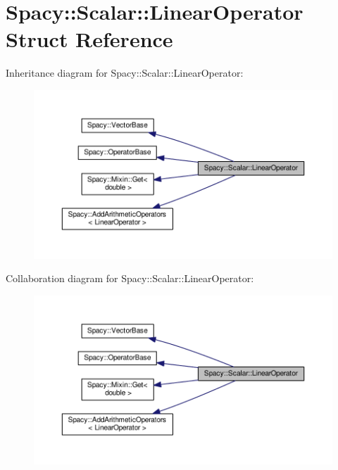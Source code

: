 \hypertarget{structSpacy_1_1Scalar_1_1LinearOperator}{}\section{Spacy\+:\+:Scalar\+:\+:Linear\+Operator Struct Reference}
\label{structSpacy_1_1Scalar_1_1LinearOperator}


Inheritance diagram for Spacy\+:\+:Scalar\+:\+:Linear\+Operator\+:\nopagebreak
\begin{figure}[H]
\begin{center}
\leavevmode
\includegraphics[width=350pt]{structSpacy_1_1Scalar_1_1LinearOperator__inherit__graph}
\end{center}
\end{figure}


Collaboration diagram for Spacy\+:\+:Scalar\+:\+:Linear\+Operator\+:\nopagebreak
\begin{figure}[H]
\begin{center}
\leavevmode
\includegraphics[width=350pt]{structSpacy_1_1Scalar_1_1LinearOperator__coll__graph}
\end{center}
\end{figure}
